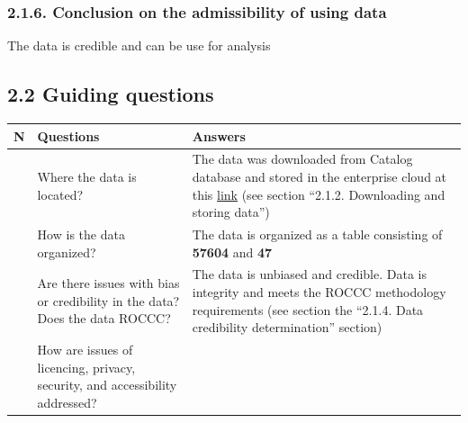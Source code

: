 \documentclass[
]{article}
\begin{document}
\subsubsection{\texorpdfstring{\textbf{2.1.6. Conclusion on the
admissibility of using
data}}{2.1.6. Conclusion on the admissibility of using data}}\label{conclusion-on-the-admissibility-of-using-data}

The data is credible and can be use for analysis

\subsection{\texorpdfstring{\textbf{2.2 Guiding
questions}}{2.2 Guiding questions}}\label{guiding-questions-1}

\begin{longtable}[]{@{}
  >{\raggedright\arraybackslash}p{}
  >{\raggedright\arraybackslash}p{}
  >{\raggedright\arraybackslash}p{}@{}}
\toprule\noalign{}
\begin{minipage}[b]{\linewidth}\raggedright
N
\end{minipage} & \begin{minipage}[b]{\linewidth}\raggedright
Questions
\end{minipage} & \begin{minipage}[b]{\linewidth}\raggedright
Answers
\end{minipage} \\
\midrule\noalign{}
\endhead
\bottomrule\noalign{}
\endlastfoot
1 & Where the data is located? & The data was downloaded from Catalog
database and stored in the enterprise cloud at this
\href{https://drive.ac-mos.ru/f/4038789}{link} (see section ``2.1.2.
Downloading and storing data'') \\
2 & How is the data organized? & The data is organized as a table
consisting of \textbf{57604} and \textbf{47} \\
3 & Are there issues with bias or credibility in the data? Does the data
ROCCC? & The data is unbiased and credible. Data is integrity and meets
the ROCCC methodology requirements (see section the ``2.1.4. Data
credibility determination'' section) \\
4 & How are issues of licencing, privacy, security, and accessibility
addressed? & \\
\end{longtable}
\end{document}
